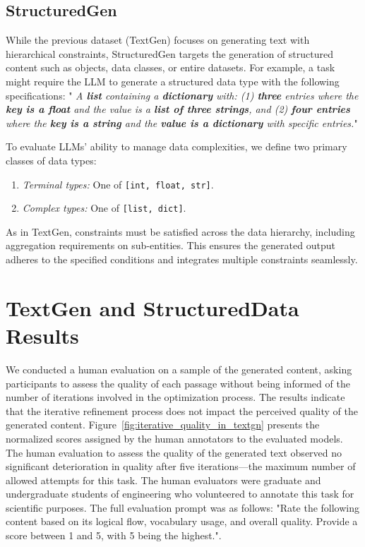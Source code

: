 \documentclass[10pt]{article} %
\begin{document}
    \subsection{StructuredGen}
    While the previous dataset (TextGen) focuses on generating text with hierarchical constraints, StructuredGen targets the generation of structured content such as objects, data classes, or entire datasets. For example, a task might require the LLM to generate a structured data type with the following specifications: " \textit{A \textbf{list} containing a \textbf{dictionary} with: (1) \textbf{three} entries where the \textbf{key is a float} and the value is a \textbf{list of three strings}, and (2) \textbf{four entries} where the \textbf{key is a string} and the \textbf{value is a dictionary} with specific entries.}"
        
    To evaluate LLMs' ability to manage data complexities, we define two primary classes of data types:
    \begin{enumerate}
        \item \emph{Terminal types:} One of \texttt{[int, float, str]}.
        \item \emph{Complex types:} One of \texttt{[list, dict]}.
    \end{enumerate}
    
    As in TextGen, constraints must be satisfied across the data hierarchy, including aggregation requirements on sub-entities. This ensures the generated output adheres to the specified conditions and integrates multiple constraints seamlessly.
    

    
    
    \section{TextGen and StructuredData Results}
    \label{app:textgen_results}
    We conducted a human evaluation on a sample of the generated content, asking participants to assess the quality of each passage without being informed of the number of iterations involved in the optimization process. The results indicate that the iterative refinement process does not impact the perceived quality of the generated content. Figure~\ref{fig:iterative_quality_in_textgn} presents the normalized scores assigned by the human annotators to the evaluated models.
    The human evaluation to assess the quality of the generated text observed no significant deterioration in quality after five iterations—the maximum number of allowed attempts for this task. The human evaluators were graduate and undergraduate students of engineering who volunteered to annotate this task for scientific purposes. The full evaluation prompt was as follows: "Rate the following content based on its logical flow, vocabulary usage, and overall quality. Provide a score between 1 and 5, with 5 being the highest.".
\end{document}
